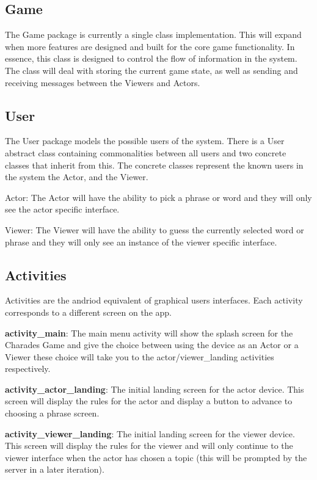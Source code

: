 \documentclass{article}
\begin{document}
\subsection{Game}
The Game package is currently a single class implementation. This will expand when more features are designed and built for the core game functionality. In essence, this class is designed to control the flow of information in the system. The class will deal with storing the current game state, as well as sending and receiving messages between the Viewers and Actors.


\subsection{User}
The User package models the possible users of the system. There is a User abstract class containing commonalities between all users and two concrete classes that inherit from this. The concrete classes represent the known users in the system the Actor, and the Viewer. 

Actor: The Actor will have the ability to pick a phrase or word and they will only see the actor specific interface.

Viewer: The Viewer will have the ability to guess the currently selected word or phrase and they will only see an instance of the viewer specific interface.

\subsection{Activities}
Activities are the andriod equivalent of graphical users interfaces. Each activity corresponds to a different screen on the app.

\textbf{activity\_main}: The main menu activity will show the splash screen for the Charades Game and give the choice between using the device as an Actor or a Viewer these choice will take you to the actor/viewer\_landing activities respectively.

\textbf{activity\_actor\_landing}: The initial landing screen for the actor device. This screen will display the rules for the actor and display a button to advance to choosing a phrase screen.

\textbf{activity\_viewer\_landing}: The initial landing screen for the viewer device. This screen will display the rules for the viewer and will only continue to the viewer interface when the actor has chosen a topic (this will be prompted by the server in a later iteration).
\end{document}
